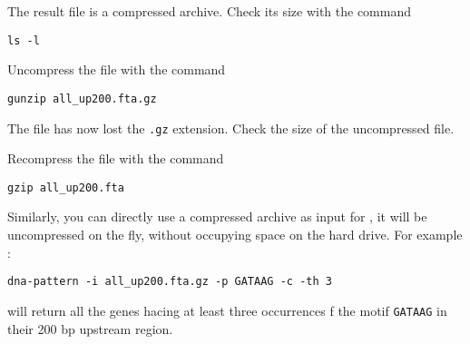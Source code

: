 The result file is a compressed archive. Check its size with the
command 
\begin{verbatim}
ls -l
\end{verbatim}

Uncompress the file with the command 
\begin{verbatim}
gunzip all_up200.fta.gz
\end{verbatim}

The file has now lost the \texttt{.gz} extension. Check the size of the
uncompressed file.

Recompress the file with the command
\begin{verbatim}
gzip all_up200.fta
\end{verbatim}

Similarly, you can directly use a compressed archive as input for
\RSAT, it will be uncompressed on the fly, without occupying space on
the hard drive. For example :

\begin{verbatim}
dna-pattern -i all_up200.fta.gz -p GATAAG -c -th 3
\end{verbatim}

will return all the genes hacing at least three occurrences f the
motif \texttt{GATAAG} in their 200 bp upstream region.
